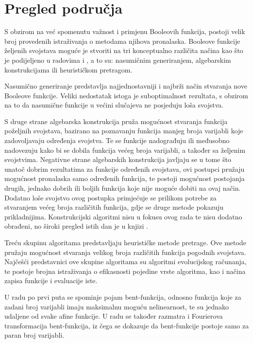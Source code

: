 \documentclass[times, utf8, diplomski, numeric]{fer}
\begin{document}
\chapter{Pregled područja}
S obzirom na već spomenutu važnost i primjenu Booleovih funkcija, postoji velik broj provedenih istraživanja o metodama njihova pronalaska.
Booleove funkcije željenih svojstava moguće je stvoriti na tri konceptualno različita načina kao što je podijeljeno u radovima \cite{picek2016new} i \cite{CryptographicBoolean}, a to su: nasumičnim generiranjem, algebarskim konstrukcijama ili heurističkom pretragom.

Nasumično generiranje predstavlja najjednostavniji i najbrži način stvaranja nove Booleove funkcije.
Veliki nedostatak istoga je suboptimalnost rezultata, s obzirom na to da nasumične funkcije u većini slučajeva ne posjeduju loša svojstva.

S druge strane algebarska konstrukcija pruža mogućnost stvaranja funkcija poželjnih svojstava, bazirano na poznavanju funkcija manjeg broja varijabli koje zadovoljavaju određenja svojstva.
Te se funkcije nadograđuju ili međusobno nadovezuju kako bi se dobila funkcija većeg broja varijabli, a također sa željenim svojstvima.
Negativne strane algebarskih konstrukcija javljaju se u tome što unatoč dobrim rezultatima za funkcije određenih svojstava, ovi postupci pružaju mogućnost pronalaska samo određenih funkcija, te postoji mogućnost postojanja drugih, jednako dobrih ili boljih funkcija koje nije moguće dobiti na ovaj način.
Dodatno loše svojstvo ovog postupka primjećuje se prilikom potrebe za stvaranjem većeg broja različitih funkcija, gdje se druge metode pokazuju prikladnijima.
Konstrukcijski algoritmi nisu u fokusu ovog rada te nisu dodatno obrađeni, no široki pregled istih dan je u knjizi \cite{CryptographicBooleanFunctions}.

Treću skupinu algoritama predstavljaju heurističke metode pretrage.
Ove metode pružaju mogućnost stvaranja velikog broja različitih funkcija pogodnih svojstava.
Najčešći predstavnici ove skupine algoritama su algoritmi evolucijskog računanja, te postoje brojna istraživanja o efikasnosti pojedine vrste algoritma, kao i načina zapisa funkcije i evaluacije iste.

U radu \cite{OnBentFunctions} po prvi puta se spominje pojam bent-funkcija, odnosno funkcija koje za zadani broj varijabli imaju maksimalnu moguću nelinearnost, te su jednako udaljene od svake afine funkcije.
U radu se također razmatra i Fourierova transformacija bent-funkcija, iz čega se dokazuje da bent-funkcije postoje samo za paran broj varijabli.
\end{document}

